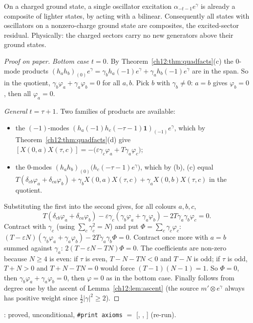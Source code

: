 \begin{physics}
On a charged ground state, a single oscillator excitation $\alpha_{-t-1}e^\gamma$ is already a composite of lighter states, by acting with a bilinear. Consequently all states with oscillators on a nonzero-charge ground state are composites, the excited-sector residual. Physically: the charged sectors carry no new generators above their ground states.
\end{physics}
\begin{proof}[Proof on paper]
\emph{Bottom case $t=0$.}  By Theorem~\ref{ch12:thm:quadfacts}(c) the $0$-mode products
$(h_ah_b)_{(0)}e^\gamma=\gamma_bh_a(-1)e^\gamma+\gamma_ah_b(-1)e^\gamma$ are in the span.  So in the quotient,
$\gamma_b\varphi_a+\gamma_a\varphi_b=0$ for all $a,b$.  Pick $b$ with $\gamma_b\neq0$: $a=b$ gives $\varphi_b=0$, then
all $\varphi_a=0$.

\emph{General $t=\tau+1$.}  Two families of products are available:
\begin{itemize}
\item the $(-1)$-modes $(h_a(-1)h_c(-\tau-1)\mathbf 1)_{(-1)}e^\gamma$, which by
  Theorem~\ref{ch12:thm:quadfacts}(d) give
  $[X(0,a)X(\tau,c)] = -\big(\varepsilon\gamma_c\varphi_a+T\gamma_a\varphi_c\big)$;
\item the $0$-modes $(h_ah_b)_{(0)}\big(h_c(-\tau-1)e^\gamma\big)$, which by (b), (c) equal
  $T(\delta_{cb}\varphi_a+\delta_{ca}\varphi_b)+\gamma_bX(0,a)X(\tau,c)+\gamma_aX(0,b)X(\tau,c)$ in the quotient.
\end{itemize}
Substituting the first into the second gives, for all colours $a,b,c$,
\begin{equation*}
 T(\delta_{cb}\varphi_a+\delta_{ca}\varphi_b)-\varepsilon\gamma_c(\gamma_b\varphi_a+\gamma_a\varphi_b)-2T\gamma_a\gamma_b\varphi_c = 0 .
\end{equation*}
Contract with $\gamma_c$ (using $\sum_c\gamma_c^2=N$) and put $\Phi=\sum_c\gamma_c\varphi_c$:
$(T-\varepsilon N)(\gamma_b\varphi_a+\gamma_a\varphi_b)-2T\gamma_a\gamma_b\Phi=0$.  Contract once more with $a=b$ summed
against $\gamma_a$: $2(T-\varepsilon N-TN)\Phi=0$.  The coefficients are non-zero because $N\ge4$ is even:
if $\tau$ is even, $T-N-TN<0$ and $T-N$ is odd; if $\tau$ is odd, $T+N>0$ and $T+N-TN=0$ would force
$(T-1)(N-1)=1$.  So $\Phi=0$, then $\gamma_b\varphi_a+\gamma_a\varphi_b=0$, then $\varphi=0$ as in the bottom case.
Finally  follows from degree one by the ascent of Lemma~\ref{ch12:lem:ascent}
(the source $m'\otimes e^\gamma$ always has positive weight since $\tfrac12|\gamma|^2\ge2$).
\end{proof}
\begin{status}: proved, unconditional, \texttt{\#print axioms} $=$
[, , ] (re-run).\end{status}


